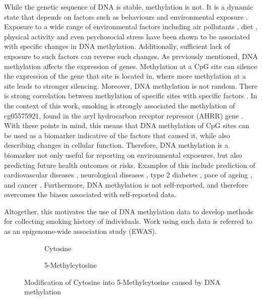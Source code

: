 \documentclass{article}
\begin{document}
While the genetic sequence of DNA is stable, methylation is not. It is a dynamic state that depends on factors such as behaviours and environmental exposure \cite{greenberg2019diverse}. Exposure to a wide range of environmental factors including air pollutants \cite{martin2018environmental}, diet \cite{ma2020whole}, physical activity and even psychosocial stress \cite{opsasnick2024epigenome} have been shown to be associated with specific changes in DNA methylation. Additionally, sufficient lack of exposure to such factors can reverse such changes. As previously mentioned, DNA methylation affects the expression of genes. Methylation at a CpG site can silence the expression of the gene that site is located in, where more methylation at a site leads to stronger silencing. Moreover, DNA methylation is not random. There is strong correlation between methylation of specific sites with specific factors \cite{ewasatlas}. In the context of this work, smoking is strongly associated the methylation of cg05575921, found in the aryl hydrocarbon receptor
repressor (AHRR) gene \cite{reynolds2015dna}. With these points in mind, this means that DNA methylation of CpG sites can be used as a biomarker indicative of the factors that caused it, while also describing changes in cellular function. Therefore, DNA methylation is a biomarker not only useful for reporting on environmental exposures, but also predicting future health outcomes or risks. Examples of this include prediction of cardiovascular diseases \cite{cameron2023dna}, neurological diseases \cite{cells11213439}, type 2 diabetes \cite{cheng2023development}, pace of ageing \cite{10.7554/eLife.73420}, and cancer \cite{luo2020circulating}. Furthermore, DNA methylation is not self-reported, and therefore overcomes the biases associated with self-reported data.

Altogether, this motivates the use of DNA methylation data to develop methods for collecting smoking history of individuals. Work using such data is referred to as an epigenome-wide association study (EWAS).

\begin{figure}
    \begin{subfigure}{0.49\textwidth}
        \centering
        \hspace*{11mm}
        \vspace{3mm}
        \caption{Cytosine}
    \end{subfigure}
    \begin{subfigure}{0.49\textwidth}
        \centering
        \vspace{3mm}
        \caption{5-Methylcytosine}
    \end{subfigure}
    \caption*{Modification of Cytosine into 5-Methylcytosine caused by DNA methylation}
\end{figure}
\end{document}
